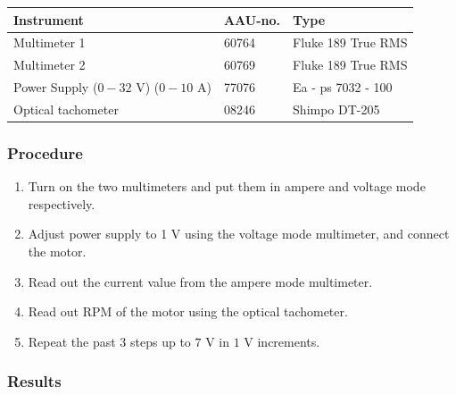 \begin{table}[H]
\begin{tabular}{|l|l|p{4cm}|}
\hline%
  \textbf{Instrument}                        &  \textbf{AAU-no.}  &  \textbf{Type}       \\
\hline%
  Multimeter 1                               &  60764             &  Fluke 189 True RMS  \\
\hline%
  Multimeter 2                   		         &  60769             &  Fluke 189 True RMS  \\
\hline%
  Power Supply ($0 - 32$ V) ($0 - 10$ A)     &  77076             &  Ea - ps 7032 - 100  \\
\hline%
  Optical tachometer                         &  08246             &  Shimpo DT-205       \\
\hline%
\end{tabular}
\end{table}

\subsubsection{Procedure}

\begin{enumerate}
  \item Turn on the two multimeters and put them in ampere and voltage mode respectively.
  \item Adjust power supply to 1 V using the voltage mode multimeter, and connect the motor.
  \item Read out the current value from the ampere mode multimeter.
  \item Read out RPM of the motor using the optical tachometer.
  \item Repeat the past $3$ steps up to $7$ V in $1$ V increments.
\end{enumerate}

\subsubsection{Results}

